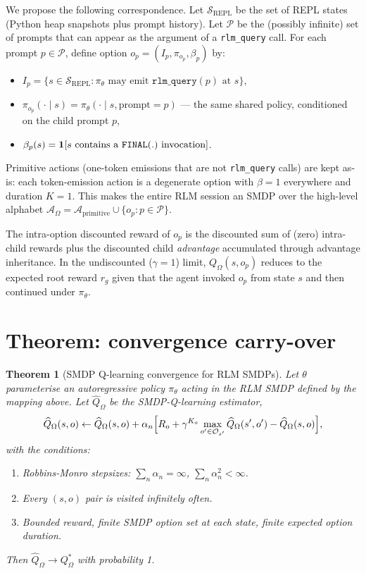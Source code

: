 \documentclass[11pt]{article}
\newtheorem{theorem}{Theorem}
\begin{document}
We propose the following correspondence. Let $\mathcal{S}_{\mathrm{REPL}}$ be
the set of REPL states (Python heap snapshots plus prompt history). Let
$\mathcal{P}$ be the (possibly infinite) set of prompts that can appear as the
argument of a \texttt{rlm\_query} call. For each prompt $p \in \mathcal{P}$,
define option $o_p = (I_p, \pi_{o_p}, \beta_p)$ by:
\begin{itemize}
\item $I_p = \{s \in \mathcal{S}_{\mathrm{REPL}} : \pi_\theta\text{ may emit } \texttt{rlm\_query}(p) \text{ at } s\}$,
\item $\pi_{o_p}(\cdot \mid s) = \pi_\theta(\cdot \mid s, \text{prompt} = p)$ ---
      the same shared policy, conditioned on the child prompt $p$,
\item $\beta_p(s) = \mathbf{1}[s \text{ contains a \texttt{FINAL}(.)} \text{ invocation}]$.
\end{itemize}

Primitive actions (one-token emissions that are not \texttt{rlm\_query} calls)
are kept as-is: each token-emission action is a degenerate option with
$\beta = 1$ everywhere and duration $K = 1$. This makes the entire RLM
session an SMDP over the high-level alphabet
$\mathcal{A}_{\Omega} = \mathcal{A}_{\mathrm{primitive}} \cup \{o_p : p \in \mathcal{P}\}$.

The intra-option discounted reward of $o_p$ is the discounted sum of (zero)
intra-child rewards plus the discounted child \emph{advantage} accumulated
through advantage inheritance. In the undiscounted ($\gamma = 1$) limit,
$Q_\Omega(s, o_p)$ reduces to the expected root reward $r_g$ given that the
agent invoked $o_p$ from state $s$ and then continued under $\pi_\theta$.

\section*{Theorem: convergence carry-over}

\begin{theorem}[SMDP Q-learning convergence for RLM SMDPs]
\label{thm:smdp}
Let $\theta$ parameterise an autoregressive policy $\pi_\theta$ acting in the
RLM SMDP defined by the mapping above. Let $\widehat Q_\Omega$ be the
SMDP-Q-learning estimator,
\[
\widehat Q_\Omega(s, o) \leftarrow \widehat Q_\Omega(s, o) + \alpha_n
   \Bigl[ R_o + \gamma^{K_o} \max_{o' \in \mathcal{O}_{s'}} \widehat Q_\Omega(s', o')
   - \widehat Q_\Omega(s, o)\Bigr],
\]
with the conditions:
\begin{enumerate}[label=(\roman*)]
\item Robbins-Monro stepsizes: $\sum_n \alpha_n = \infty$, $\sum_n \alpha_n^2 < \infty$.
\item Every $(s, o)$ pair is visited infinitely often.
\item Bounded reward, finite SMDP option set at each state, finite expected
      option duration.
\end{enumerate}
Then $\widehat Q_\Omega \to Q^*_\Omega$ with probability 1.
\end{theorem}
\end{document}

